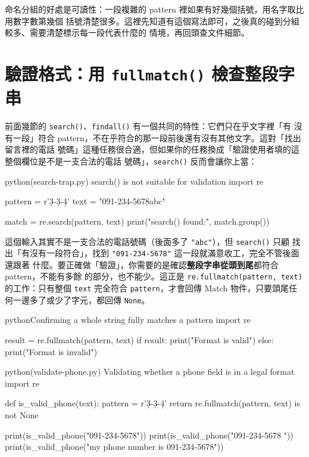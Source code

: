
命名分組的好處是可讀性：一段複雜的 pattern 裡如果有好幾個括號，用名字取比用數字數第幾個
括號清楚很多。這裡先知道有這個寫法即可，之後真的碰到分組較多、需要清楚標示每一段代表什麼的
情境，再回頭查文件細節。

\section{驗證格式：用 \texttt{fullmatch()} 檢查整段字串}
\label{sec:regex-fullmatch}

前面幾節的 \texttt{search()}、\texttt{findall()} 有一個共同的特性：它們只在乎文字裡「有
沒有一段」符合 pattern，不在乎符合的那一段前後還有沒有其他文字。這對「找出留言裡的電話
號碼」這種任務很合適，但如果你的任務換成「驗證使用者填的這整個欄位是不是一支合法的電話
號碼」，\texttt{search()} 反而會讓你上當：

\begin{example}{python}{(search-trap.py) search() is not suitable for validation}
import re

pattern = r'\d{3}-\d{3}-\d{4}'
text = "091-234-5678abc"

match = re.search(pattern, text)
print("search() found:", match.group())
\end{example}


這個輸入其實不是一支合法的電話號碼（後面多了 \texttt{"abc"}），但 \texttt{search()} 只顧
找出「有沒有一段符合」，找到 \texttt{"091-234-5678"} 這一段就滿意收工，完全不管後面還跟著
什麼。要正確做「驗證」，你需要的是確認\textbf{整段字串從頭到尾}都符合 pattern，不能有多餘
的部分，也不能少。這正是 \texttt{re.fullmatch(pattern, text)} 的工作：只有整個 \texttt{text}
完全符合 \texttt{pattern}，才會回傳 Match 物件，只要頭尾任何一邊多了或少了字元，都回傳
\texttt{None}。

\begin{code}{python}{Confirming a whole string fully matches a pattern}
import re

result = re.fullmatch(pattern, text)
if result:
    print("Format is valid")
else:
    print("Format is invalid")
\end{code}

\begin{example}{python}{(validate-phone.py) Validating whether a phone field is in a legal format}
import re

def is_valid_phone(text):
    pattern = r'\d{3}-\d{3}-\d{4}'
    return re.fullmatch(pattern, text) is not None

print(is_valid_phone("091-234-5678"))
print(is_valid_phone("091-234-5678 "))
print(is_valid_phone("my phone number is 091-234-5678"))
\end{example}

